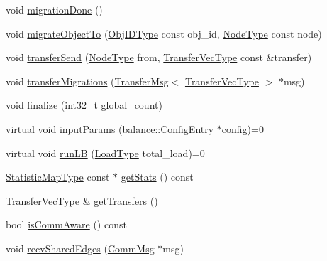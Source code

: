 \begin{DoxyCompactItemize}
\item 
void \hyperlink{structvt_1_1vrt_1_1collection_1_1lb_1_1_base_l_b_ac8ed2cc09aec1f84e179ba734da71960}{migration\+Done} ()
\item 
void \hyperlink{structvt_1_1vrt_1_1collection_1_1lb_1_1_base_l_b_a952846044ca0d13d25ca828b84112d0e}{migrate\+Object\+To} (\hyperlink{structvt_1_1vrt_1_1collection_1_1lb_1_1_base_l_b_a790b22acf448880599724749cdc4e9b3}{Obj\+I\+D\+Type} const obj\+\_\+id, \hyperlink{namespacevt_a866da9d0efc19c0a1ce79e9e492f47e2}{Node\+Type} const node)
\item 
void \hyperlink{structvt_1_1vrt_1_1collection_1_1lb_1_1_base_l_b_af8d95bc056659de7121bca99ce2d9d73}{transfer\+Send} (\hyperlink{namespacevt_a866da9d0efc19c0a1ce79e9e492f47e2}{Node\+Type} from, \hyperlink{structvt_1_1vrt_1_1collection_1_1lb_1_1_base_l_b_a329e8179ec41a1bd4924c79fe23a79af}{Transfer\+Vec\+Type} const \&transfer)
\item 
void \hyperlink{structvt_1_1vrt_1_1collection_1_1lb_1_1_base_l_b_adb9e1197bc690340bc1a4a6c77ac5254}{transfer\+Migrations} (\hyperlink{structvt_1_1vrt_1_1collection_1_1lb_1_1_transfer_msg}{Transfer\+Msg}$<$ \hyperlink{structvt_1_1vrt_1_1collection_1_1lb_1_1_base_l_b_a329e8179ec41a1bd4924c79fe23a79af}{Transfer\+Vec\+Type} $>$ $\ast$msg)
\item 
void \hyperlink{structvt_1_1vrt_1_1collection_1_1lb_1_1_base_l_b_af434b83087858c78365c168fa849055b}{finalize} (int32\+\_\+t global\+\_\+count)
\item 
virtual void \hyperlink{structvt_1_1vrt_1_1collection_1_1lb_1_1_base_l_b_acf56a0cc29f5e00c0dccf2003baa2f43}{input\+Params} (\hyperlink{structvt_1_1vrt_1_1collection_1_1balance_1_1_config_entry}{balance\+::\+Config\+Entry} $\ast$config)=0
\item 
virtual void \hyperlink{structvt_1_1vrt_1_1collection_1_1lb_1_1_base_l_b_aa957038bb132ac29fb61535487f0604f}{run\+LB} (\hyperlink{namespacevt_a8fb51741340b87d7aaee0bef60e9896b}{Load\+Type} total\+\_\+load)=0
\item 
\hyperlink{structvt_1_1vrt_1_1collection_1_1lb_1_1_base_l_b_acd9bdad961ac83c96b7a227de672f96c}{Statistic\+Map\+Type} const  $\ast$ \hyperlink{structvt_1_1vrt_1_1collection_1_1lb_1_1_base_l_b_a8e3d3231dc49c55c1c494a5e5957baa1}{get\+Stats} () const
\item 
\hyperlink{structvt_1_1vrt_1_1collection_1_1lb_1_1_base_l_b_a329e8179ec41a1bd4924c79fe23a79af}{Transfer\+Vec\+Type} \& \hyperlink{structvt_1_1vrt_1_1collection_1_1lb_1_1_base_l_b_ace9ba67a70c21b1198feee35827eea11}{get\+Transfers} ()
\item 
bool \hyperlink{structvt_1_1vrt_1_1collection_1_1lb_1_1_base_l_b_a7ea645705b9a7bded2ab8551dd261d26}{is\+Comm\+Aware} () const
\item 
void \hyperlink{structvt_1_1vrt_1_1collection_1_1lb_1_1_base_l_b_a5fc35b2b0fb14da5a44b124b4dc8fbc9}{recv\+Shared\+Edges} (\hyperlink{structvt_1_1vrt_1_1collection_1_1lb_1_1_comm_msg}{Comm\+Msg} $\ast$msg)
\end{DoxyCompactItemize}
